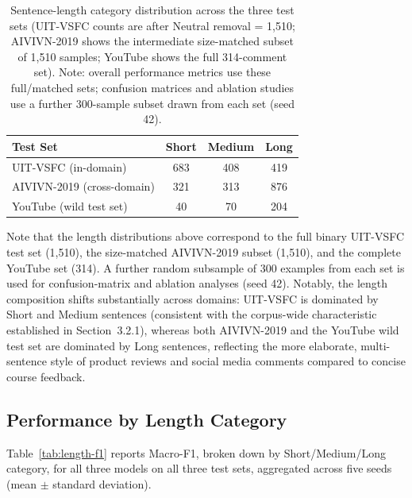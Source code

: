\documentclass[12pt]{report} %
\begin{document}
\begin{table}[htbp]
    \centering

    \caption{Sentence-length category distribution across the three test sets
        (UIT-VSFC counts are after Neutral removal = 1,510;
        AIVIVN-2019 shows the intermediate size-matched subset of 1,510 samples;
        YouTube shows the full 314-comment set).
        Note: overall performance metrics use these full/matched sets;
        confusion matrices and ablation studies use a further 300-sample subset drawn from each set (seed 42).}
    \label{tab:length-dist}

    \begin{tabular}{lccc}
        \hline
        \textbf{Test Set}          & \textbf{Short} & \textbf{Medium} & \textbf{Long} \\
        \hline
        UIT-VSFC (in-domain)       & 683            & 408             & 419           \\
        AIVIVN-2019 (cross-domain) & 321            & 313             & 876           \\
        YouTube (wild test set)    & 40             & 70              & 204           \\
        \hline
    \end{tabular}
\end{table}
Note that the length distributions above correspond to the full binary UIT-VSFC test set (1,510),
the size-matched AIVIVN-2019 subset (1,510), and the complete YouTube set (314).
A further random subsample of 300 examples from each set is used for confusion-matrix and ablation analyses (seed 42).
Notably, the length composition shifts substantially across domains: UIT-VSFC is dominated by Short and Medium sentences (consistent with the corpus-wide characteristic established in Section~3.2.1), whereas both AIVIVN-2019 and the YouTube wild test set are dominated by Long sentences, reflecting the more elaborate, multi-sentence style of product reviews and social media comments compared to concise course feedback.

\subsection{Performance by Length Category}
Table~\ref{tab:length-f1} reports Macro-F1, broken down by Short/Medium/Long category, for all three models on all three test sets, aggregated across five seeds (mean $\pm$ standard deviation).
\end{document}
